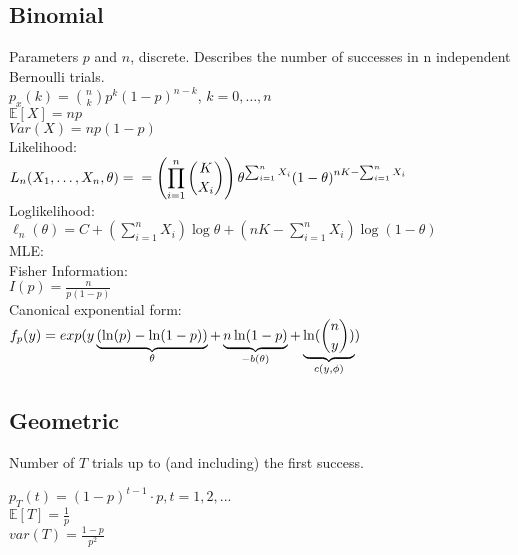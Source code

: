 \subsection*{Binomial}
Parameters $p$ and $n$, discrete. Describes the number of successes
in n independent Bernoulli trials.\\

$p_x(k)= {n\choose k}{p}^{k} \left( 1-p \right) ^{n-k}$, $k=0,\ldots, n$\\

$\mathbb{E}[X]=np$\\

$Var(X)= np(1-p)$ \\

Likelihood:\\

$\displaystyle  L_ n(X_1, \ldots , X_ n, \theta ) =\\
= \left( \prod _{i = 1}^ n \binom {K}{X_ i} \right) \theta ^{\sum _{i = 1}^ n X_ i} (1 - \theta )^{nK - \sum _{i = 1}^ n X_ i }$\\

Loglikelihood:\\

$\ell_n (\theta) = C + \left( \sum _{i = 1}^ n X_ i \right) \log \theta + \left( nK - \sum _{i = 1}^ n X_ i \right) \log (1 - \theta )$\\

MLE:\\


Fisher Information:\\

$I(p) = \frac{n}{p(1-p)}$\\

Canonical exponential form:\\

$f_ p(y) =\\  
exp (y \underbrace{(\ln (p)-\ln (1-p))}_{\theta } + \underbrace{n\ln (1-p)}_{-b(\theta )} +\underbrace{\ln(\binom {n}{y})}_{c(y,\phi )} )$

\subsection*{Geometric}
Number of $T$ trials up to (and including) the first success. 

$p_T(t) = (1-p)^{t-1} \cdot p, t=1,2,...$\\
$\mathbb{E}[T]=\frac{1}{p}$\\
$var(T)=\frac{1-p}{p^2}$


